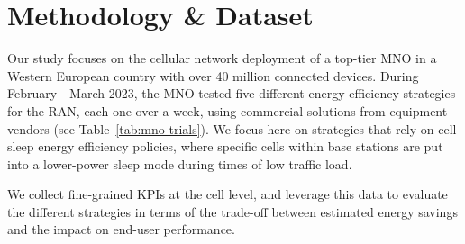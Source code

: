 \vspace{-2pt}
\section{Methodology \& Dataset}
\vspace{-4pt}

Our study focuses on the cellular network deployment of a top-tier MNO in a Western European country with over 40 million connected devices. 
During February - March 2023, the MNO tested five different energy efficiency strategies for the RAN, each one over a week, using commercial solutions from equipment vendors (see Table~\ref{tab:mno-trials}).
We focus here on strategies that rely on cell sleep energy efficiency policies, where specific cells within base stations are put into a lower-power sleep mode during times of low traffic load.

We collect fine-grained KPIs at the cell level, and leverage this data to evaluate the different strategies in terms of the trade-off between estimated energy savings and the impact on end-user performance.


